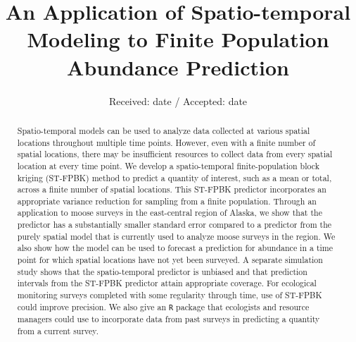 \documentclass[]{article}    %
\begin{document}
\title{An Application of Spatio-temporal Modeling to Finite Population
Abundance Prediction }







\date{Received: date / Accepted: date}


\maketitle

\begin{abstract}
Spatio-temporal models can be used to analyze data collected at various
spatial locations throughout multiple time points. However, even with a
finite number of spatial locations, there may be insufficient resources
to collect data from every spatial location at every time point. We
develop a spatio-temporal finite-population block kriging (ST-FPBK)
method to predict a quantity of interest, such as a mean or total,
across a finite number of spatial locations. This ST-FPBK predictor
incorporates an appropriate variance reduction for sampling from a
finite population. Through an application to moose surveys in the
east-central region of Alaska, we show that the predictor has a
substantially smaller standard error compared to a predictor from the
purely spatial model that is currently used to analyze moose surveys in
the region. We also show how the model can be used to forecast a
prediction for abundance in a time point for which spatial locations
have not yet been surveyed. A separate simulation study shows that the
spatio-temporal predictor is unbiased and that prediction intervals from
the ST-FPBK predictor attain appropriate coverage. For ecological
monitoring surveys completed with some regularity through time, use of
ST-FPBK could improve precision. We also give an \texttt{R} package that
ecologists and resource managers could use to incorporate data from past
surveys in predicting a quantity from a current survey.
\\


\end{abstract}


\def\spacingset#1{\renewcommand{\baselinestretch}%
{#1}\small\normalsize} \spacingset{1}
\end{document}
